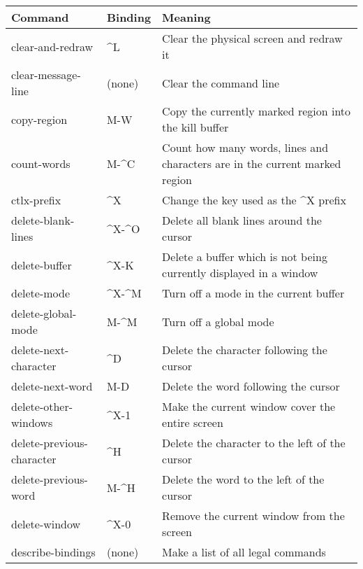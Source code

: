 \begin{tabular}{llp{287pt}}
Command & Binding & Meaning\\ \hline
clear-and-redraw &  \^{}L & Clear the physical screen and redraw it\\

clear-message-line & (none) & Clear the command line\\

copy-region &  M-W & Copy the currently marked region into
the kill buffer\\

count-words &  M-\^{}C & Count how many words, lines and
characters are in the current marked region\\

ctlx-prefix &  \^{}X & Change the key used as the \^{}X prefix\\

delete-blank-lines & \^{}X-\^{}O & Delete all blank lines around the
cursor\\

delete-buffer &  \^{}X-K & Delete a buffer which is not being
currently displayed in a window\\

delete-mode &  \^{}X-\^{}M & Turn off a mode in the current buffer\\

delete-global-mode &  M-\^{}M & Turn off a global mode\\

delete-next-character &  \^{}D & Delete the character following the cursor\\

delete-next-word &  M-D & Delete the word following the cursor\\

delete-other-windows &  \^{}X-1 & Make the current window cover the entire
screen\\

delete-previous-character & \^{}H & Delete the character to the left of the
cursor\\

delete-previous-word & M-\^{}H & Delete the word to the left of the
cursor\\

delete-window &  \^{}X-0 & Remove the current window from the screen\\

describe-bindings & (none) & Make a list of all legal commands\\


\end{tabular}
